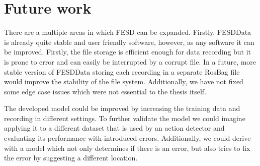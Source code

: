 \section{Future work}
\label{sec:future_work}

There are a multiple areas in which FESD can be expanded. Firstly, FESDData is already quite stable and user friendly software, however, as any software it can be improved. Firstly, the file storage is efficient enough for data recording but it is prone to error and can easily be interrupted by a corrupt file. In a future, more stable version of FESDData storing each recording in a separate RosBag file would improve the stability of the file system. Additionally, we have not fixed some edge case issues which were not essential to the thesis itself.

The developed model could be improved by increasing the training data and recording in different settings. To further validate the model we could imagine applying it to a different dataset that is used by an action detector and evaluating its performance with introduced errors. Additionally, we could derive with a model which not only determines if there is an error, but also tries to fix the error by suggesting a different location.
